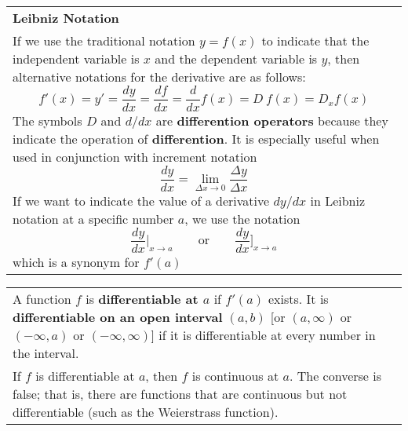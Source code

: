 \documentclass[fleqn]{article}
\begin{document}
\begin{center}
\def\arraystretch{1.3}
{\setlength{\tabcolsep}{16pt}
\begin{tabularx}{.9\textwidth}{|X|}
\hline
	\vspace{1pt}
	\textbf{Leibniz Notation} \\
	If we use the traditional notation $y=f(x)$ to indicate that the independent variable is $x$ and the dependent variable is $y$, then alternative notations for the derivative are as follows:
	$$f'(x) = y' = \dfrac{dy}{dx} = \dfrac{df}{dx} = \dfrac{d}{dx} f(x) = D \: f(x) = D_x f(x)$$
	The symbols $D$ and $d/dx$ are \textbf{differention operators} because they indicate the operation of \textbf{differention}. It is especially useful when used in conjunction with increment notation
	$$\dfrac{dy}{dx} = \underset{\Delta x \to 0}{\lim} \dfrac{\Delta y}{\Delta x}$$
	If we want to indicate the value of a derivative $dy/dx$ in Leibniz notation at a specific number $a$, we use the notation
	$$\dfrac{dy}{dx} \Big|_{x \to a} \hspace{24pt} \text{or} \hspace{24pt} \dfrac{dy}{dx} \Big]_{x \to a}$$
	which is a synonym for $f'(a)$
	\\[16pt]
	\hline
\end{tabularx}}
\vspace{12pt}

\def\arraystretch{1.3}
{\setlength{\tabcolsep}{16pt}
\begin{tabularx}{.9\textwidth}{|X|}
\hline
	\vspace{1pt}
	A function $f$ is \textbf{differentiable at $a$} if $f'(a)$ exists. It is \textbf{differentiable on an open interval} $(a, b)$ [or $(a, \infty)$ or $(-\infty, a)$ or $(-\infty, \infty)$] if it is differentiable at every number in the interval. \\[5pt]
	If $f$ is differentiable at $a$, then $f$ is continuous at $a$.  The converse is false; that is, there are functions that are continuous but not differentiable (such as the Weierstrass function).
	\\[16pt]
	\hline
\end{tabularx}}
\vspace{12pt}


\end{center}
\end{document}
